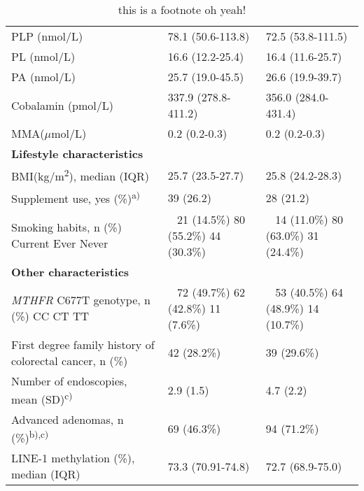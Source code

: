 \begin{table}
\begin{adjustbox}{width=\textwidth}
\begin{tabular}{L{5.5cm}L{3.5cm}L{3cm}}
 PLP (nmol/L) & 78.1 (50.6-113.8) & 72.5 (53.8-111.5)\\

 PL (nmol/L) & 16.6 (12.2-25.4) & 16.4 (11.6-25.7)\\

 PA (nmol/L) & 25.7 (19.0-45.5) & 26.6 (19.9-39.7)\\

 Cobalamin (pmol/L) & 337.9 (278.8-411.2) & 356.0 (284.0-431.4)\\

{MMA(}\textrm{${\mu}$}{mol/L)} & 0.2 (0.2-0.3) & {0.2 (0.2-0.3})\\

\bfseries Lifestyle characteristics & ~ & ~ \\

{BMI(kg/m}{\textsuperscript{2}}{), median (IQR)} & 25.7 (23.5-27.7) & 25.8 (24.2-28.3)\\

 Supplement use, yes (\%)\textsuperscript{a)} & 39 (26.2) & 28 (21.2)\\

{Smoking habits, n (\%)}{ Current}{ Ever} Never & ~ { 21 (14.5\%)}{ 80 (55.2\%)} 44 (30.3\%) & ~ { 14 (11.0\%)}{ 80 (63.0\%)} 31 (24.4\%)\\

\bfseries Other characteristics & ~ & ~ \\

{\textit{MTHFR}}{ C677T genotype, n (\%)}{ CC}{ CT} TT & ~ { 72 (49.7\%)}{ 62 (42.8\%)} 11 (7.6\%) & ~ { 53 (40.5\%)}{ 64 (48.9\%)} 14 (10.7\%)\\

 First degree family history of colorectal cancer, n (\%) & 42 (28.2\%) & 39 (29.6\%)\\

 Number of endoscopies, mean (SD)\textsuperscript{c)} & 2.9 (1.5) & 4.7 (2.2)\\

 Advanced adenomas, n
(\%)\textsuperscript{b),c)} & 69 (46.3\%) & 94 (71.2\%)\\

 LINE-1 methylation (\%), median (IQR) & 73.3 (70.91-74.8) & 72.7 (68.9-75.0)\\
\hline
\end{tabular}
\end{adjustbox}
\caption*{this is a footnote oh yeah!}
\end{table}

